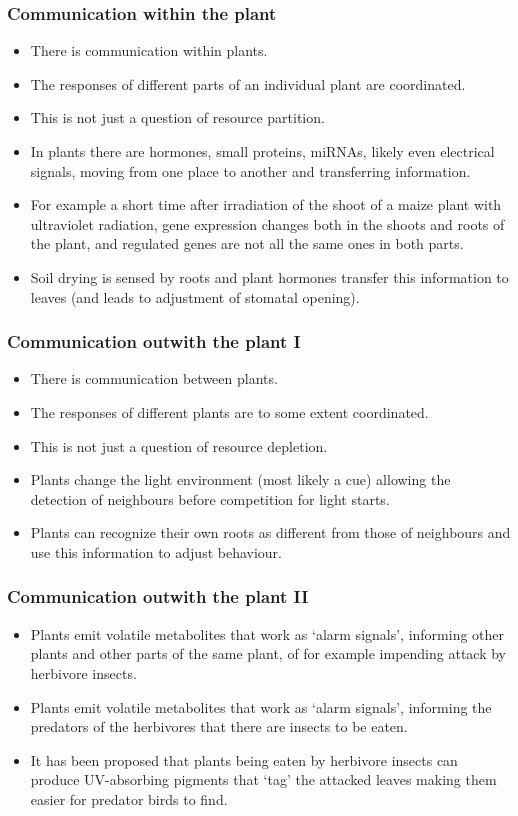 \documentclass[10pt]{beamer}
\begin{document}
\begin{frame}
\frametitle{Communication within the plant}
  \begin{itemize}
    \item There is communication within plants.
    \item The responses of different parts of an individual plant are coordinated.
    \item This is not just a question of resource partition.
    \item In plants there are hormones, small proteins, miRNAs, likely even electrical signals, moving from one place to another and transferring information.
    \item For example a short time after irradiation of the shoot of a maize plant with ultraviolet radiation, gene expression changes both in the shoots and roots of the plant, and regulated genes are not all the same ones in both parts.
    \item Soil drying is sensed by roots and plant hormones transfer this information to leaves (and leads to adjustment of stomatal opening).
  \end{itemize}
\end{frame}

\begin{frame}
\frametitle{Communication outwith the plant I}
  \begin{itemize}
    \item There is communication between plants.
    \item The responses of different plants are to some extent coordinated.
    \item This is not just a question of resource depletion.
    \item Plants change the light environment (most likely a cue) allowing the detection of neighbours before competition for light starts.
    \item Plants can recognize their own roots as different from those of neighbours and use this information to adjust behaviour.
  \end{itemize}
\end{frame}

\begin{frame}
\frametitle{Communication outwith the plant II}
  \begin{itemize}
    \item Plants emit volatile metabolites that work as `alarm signals', informing other plants and other parts of the same plant, of for example impending attack by herbivore insects.
    \item Plants emit volatile metabolites that work as `alarm signals', informing the predators of the herbivores that there are insects to be eaten.
    \item It has been proposed that plants being eaten by herbivore insects can produce UV-absorbing pigments that `tag' the attacked leaves making them easier for predator birds to find.
  \end{itemize}
\end{frame}
\end{document}
